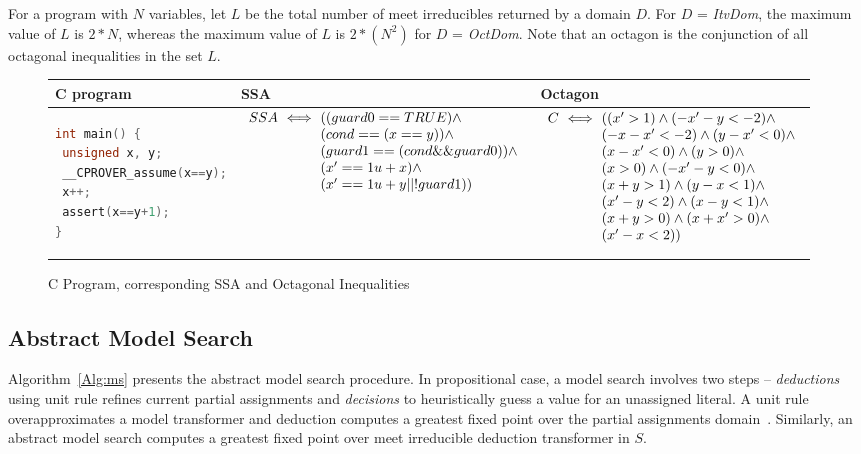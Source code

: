 For a program with $N$ variables, let $L$ be the total number of 
meet irreducibles returned by a domain $D$.  For $D$ = {\em ItvDom}, the 
maximum value of $L$ is $2*N$, whereas the maximum value of $L$ is 
$2*(N^2)$ for $D$ = {\em OctDom}. Note that an octagon is the conjunction 
of all octagonal inequalities in the set $L$.
%
\begin{figure}[t]
\scriptsize
\begin{tabular}{l|l|l}
\hline
C program & SSA & Octagon \\
\hline
\begin{lstlisting}[mathescape=true,language=C]
int main() {
 unsigned x, y;
 __CPROVER_assume(x==y);
 x++;
 assert(x==y+1);
}
\end{lstlisting}
&
\begin{minipage}{4.40cm}
$\begin{array}{l@{\,\,}c@{\,\,}l}
SSA &\iff& ((guard0 == TRUE) \land \\
    &    & (cond == (x == y)) \land \\
    &    & (guard1 == (cond \&\& guard0)) \land \\
    &    & (x' == 1u + x) \land \\
    &    & (x' == 1u + y || !guard1))
\end{array}$
\end{minipage}
&
\begin{minipage}{3.75cm}
$\begin{array}{l@{\,\,}c@{\,\,}l}
C &\iff& ((x' > 1) \land (-x'-y < -2) \land \\
  &    & (-x-x' < -2) \land (y-x' < 0) \land \\                                                                
  &    & (x-x' < 0) \land (y > 0) \land \\
  &    & (x > 0) \land (-x'-y < 0) \land \\
  &    & (x+y > 1) \land (y-x < 1) \land \\
  &    & (x'-y < 2) \land (x-y < 1) \land \\
  &    & (x+y > 0) \land (x+x' > 0) \land \\
  &    & (x'-x < 2))
\end{array}$
\end{minipage}
\\
\hline
\end{tabular}
\caption{C Program, corresponding SSA and Octagonal Inequalities}
\label{swssa}
\end{figure}
%
\subsection{Abstract Model Search}
Algorithm~\ref{Alg:ms} presents the abstract model search procedure. 
In propositional case, a model search involves two steps -- 
{\em deductions} using unit rule refines current partial assignments 
and {\em decisions} to heuristically guess a value for an unassigned 
literal.  A unit rule overapproximates a model transformer and deduction 
computes a greatest fixed point over the partial assignments
domain~\cite{dhk2013-popl}.  Similarly, an abstract model search computes
a greatest fixed point over meet irreducible deduction transformer in $S$.  


